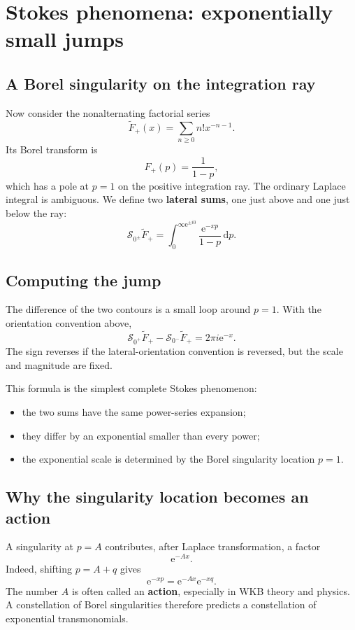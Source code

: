 \documentclass[11pt,openany]{book}
\theoremstyle{plain}
\theoremstyle{definition}
\theoremstyle{remark}
\newcommand{\dd}{\,\mathrm{d}}
\newcommand{\e}{\mathrm{e}}
\newcommand{\defterm}[1]{\textbf{#1}}
\begin{document}
\chapter{Stokes phenomena: exponentially small jumps}
\label{chap:stokes}

\section{A Borel singularity on the integration ray}
Now consider the nonalternating factorial series
\[
  \widetilde F_+(x)=\sum_{n\ge0}n!x^{-n-1}.
\]
Its Borel transform is
\[
  \widehat F_+(p)=\frac1{1-p},
\]
which has a pole at $p=1$ on the positive integration ray. The ordinary Laplace integral is ambiguous. We define two \defterm{lateral sums}, one just above and one just below the ray:
\[
  \mathscr S_{0^\pm}\widetilde F_+
  =\int_0^{\infty\e^{\pm i0}}
   \frac{\e^{-xp}}{1-p}\dd p.
\]

\section{Computing the jump}
The difference of the two contours is a small loop around $p=1$. With the orientation convention above,
\[
  \mathscr S_{0^+}\widetilde F_+
  -\mathscr S_{0^-}\widetilde F_+
  =2\pi i\e^{-x}.
  \label{eq:euler-stokes-jump}
\]
The sign reverses if the lateral-orientation convention is reversed, but the scale and magnitude are fixed.

This formula is the simplest complete Stokes phenomenon:
\begin{itemize}
\item the two sums have the same power-series expansion;
\item they differ by an exponential smaller than every power;
\item the exponential scale is determined by the Borel singularity location $p=1$.
\end{itemize}

\section{Why the singularity location becomes an action}
A singularity at $p=A$ contributes, after Laplace transformation, a factor
\[
  \e^{-Ax}.
\]
Indeed, shifting $p=A+q$ gives
\[
  \e^{-xp}=\e^{-Ax}\e^{-xq}.
\]
The number $A$ is often called an \defterm{action}, especially in WKB theory and physics. A constellation of Borel singularities therefore predicts a constellation of exponential transmonomials.
\end{document}
